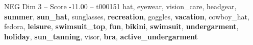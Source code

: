 \begin{textsample}{NEG Dim 3 – Score -11.00 – t000151}  \label{ex:f3_neg_036}
hat, eyewear, vision\_care, headgear, \textbf{summer}, \textbf{sun\_hat}, sunglasses, \textbf{recreation}, goggles, \textbf{vacation}, cowboy\_hat, fedora, \textbf{leisure}, \textbf{swimsuit\_top}, \textbf{fun}, \textbf{bikini}, \textbf{swimsuit}, \textbf{undergarment}, \textbf{holiday}, \textbf{sun\_tanning}, visor, \textbf{bra}, \textbf{active\_undergarment}

\end{textsample}
